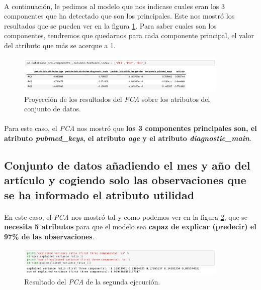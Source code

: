 \paragraph{}
A continuación, le pedimos al modelo que nos indicase cuales eran los 3 componentes que ha detectado que son los principales. Este nos mostró los resultados que se pueden ver en la figura \ref{pcaOneAtributos}. Para saber cuales son los componentes, tendremos que quedarnos para cada componente principal, el valor del atributo que más se acerque a 1.

\begin{figure}[!htb]
  \centering
    \includegraphics[width=0.9\textwidth]{images/resultados_procesado_de_datos_pca1_atributos.png}
    \caption{Proyección de los resultados del \textit{PCA} sobre los atributos del conjunto de datos.}
  \label{pcaOneAtributos}
\end{figure}

\paragraph{}
Para este caso, el \textit{PCA} nos mostró que \textbf{los 3 componentes principales son, el atributo \textit{pubmed\_keys}, el atributo \textit{age} y el atributo \textit{diagnostic\_main}}.

\subsection{Conjunto de datos añadiendo el mes y año del artículo y cogiendo solo las observaciones que se ha informado el atributo utilidad}
\label{result:pca_case2}
\paragraph{}
En este caso, el \textit{PCA} nos mostró tal y como podemos ver en la figura \ref{pcaTwoResult}, que se \textbf{necesita 5 atributos} para que el modelo sea \textbf{capaz de explicar (predecir) el 97\% de las observaciones}.

\begin{figure}[!htb]
  \centering
    \includegraphics[width=0.9\textwidth]{images/resultados_procesado_de_datos_pca2_result.png}
    \caption{Resultado del \textit{PCA} de la segunda ejecución.}
  \label{pcaTwoResult}
\end{figure}

